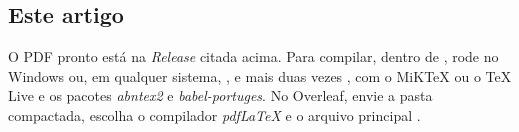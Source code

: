 \subsection{Este artigo}

O PDF pronto está na \emph{Release} citada acima. Para compilar, dentro de , rode  no Windows ou, em qualquer sistema, ,  e mais duas vezes , com o MiKTeX ou o TeX Live e os pacotes \emph{abntex2} e \emph{babel-portuges}. No Overleaf, envie a pasta  compactada, escolha o compilador \emph{pdfLaTeX} e o arquivo principal .
